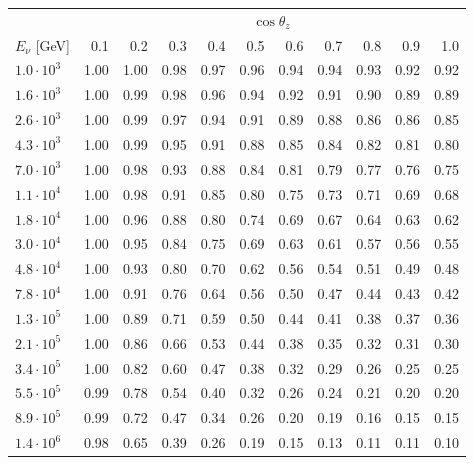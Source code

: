 \documentclass[aps,prd,showpacs,letterpaper,onecolumn,longbibliography,superscriptaddress,notitlepage,nofootinbib]{revtex4-1}%
\begin{document}
\begin{table}[h!]
\centering
\begin{tabular*}{\textwidth}{l @{\extracolsep{\fill}} r r r r r r r r r r}
\toprule
& \multicolumn{10}{c}{$\cos \theta_z$}\\
\cmidrule{2-11}
$E_\nu$ [GeV] & 0.1 & 0.2 & 0.3 & 0.4 & 0.5 & 0.6 & 0.7 & 0.8 & 0.9 & 1.0 \\ 
\midrule
$1.0\cdot10^{3}$ & 1.00 & 1.00 & 0.98 & 0.97 & 0.96 & 0.94 & 0.94 & 0.93 & 0.92 & 0.92 \\ \hline
$1.6\cdot10^{3}$ & 1.00 & 0.99 & 0.98 & 0.96 & 0.94 & 0.92 & 0.91 & 0.90 & 0.89 & 0.89 \\ \hline
$2.6\cdot10^{3}$ & 1.00 & 0.99 & 0.97 & 0.94 & 0.91 & 0.89 & 0.88 & 0.86 & 0.86 & 0.85 \\ \hline
$4.3\cdot10^{3}$ & 1.00 & 0.99 & 0.95 & 0.91 & 0.88 & 0.85 & 0.84 & 0.82 & 0.81 & 0.80 \\ \hline
$7.0\cdot10^{3}$ & 1.00 & 0.98 & 0.93 & 0.88 & 0.84 & 0.81 & 0.79 & 0.77 & 0.76 & 0.75 \\ \hline
$1.1\cdot10^{4}$ & 1.00 & 0.98 & 0.91 & 0.85 & 0.80 & 0.75 & 0.73 & 0.71 & 0.69 & 0.68 \\ \hline
$1.8\cdot10^{4}$ & 1.00 & 0.96 & 0.88 & 0.80 & 0.74 & 0.69 & 0.67 & 0.64 & 0.63 & 0.62 \\ \hline
$3.0\cdot10^{4}$ & 1.00 & 0.95 & 0.84 & 0.75 & 0.69 & 0.63 & 0.61 & 0.57 & 0.56 & 0.55 \\ \hline
$4.8\cdot10^{4}$ & 1.00 & 0.93 & 0.80 & 0.70 & 0.62 & 0.56 & 0.54 & 0.51 & 0.49 & 0.48 \\ \hline
$7.8\cdot10^{4}$ & 1.00 & 0.91 & 0.76 & 0.64 & 0.56 & 0.50 & 0.47 & 0.44 & 0.43 & 0.42 \\ \hline
$1.3\cdot10^{5}$ & 1.00 & 0.89 & 0.71 & 0.59 & 0.50 & 0.44 & 0.41 & 0.38 & 0.37 & 0.36 \\ \hline
$2.1\cdot10^{5}$ & 1.00 & 0.86 & 0.66 & 0.53 & 0.44 & 0.38 & 0.35 & 0.32 & 0.31 & 0.30 \\ \hline
$3.4\cdot10^{5}$ & 1.00 & 0.82 & 0.60 & 0.47 & 0.38 & 0.32 & 0.29 & 0.26 & 0.25 & 0.25 \\ \hline
$5.5\cdot10^{5}$ & 0.99 & 0.78 & 0.54 & 0.40 & 0.32 & 0.26 & 0.24 & 0.21 & 0.20 & 0.20 \\ \hline
$8.9\cdot10^{5}$ & 0.99 & 0.72 & 0.47 & 0.34 & 0.26 & 0.20 & 0.19 & 0.16 & 0.15 & 0.15 \\ \hline
$1.4\cdot10^{6}$ & 0.98 & 0.65 & 0.39 & 0.26 & 0.19 & 0.15 & 0.13 & 0.11 & 0.11 & 0.10 \\ \hline

\end{tabular*}
\end{table}
\end{document}
